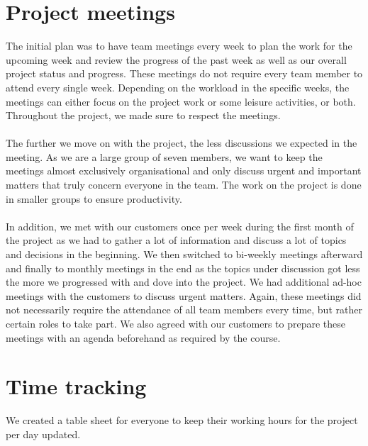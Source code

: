 \section{Project meetings}\label{sec:meetings}

The initial plan was to have team meetings every week to plan the work for the upcoming week and review the progress of the past week as well as our overall project status and progress. These meetings do not require every team member to attend every single week. Depending on the workload in the specific weeks, the meetings can either focus on the project work or some leisure activities, or both. Throughout the project, we made sure to respect the meetings.
\\\\
The further we move on with the project, the less discussions we expected in the meeting. As we are a large group of seven members, we want to keep the meetings almost exclusively organisational and only discuss urgent and important matters that truly concern everyone in the team. The work on the project is done in smaller groups to ensure productivity.
\\\\
In addition, we met with our customers once per week during the first month of the project as we had to gather a lot of information and discuss a lot of topics and decisions in the beginning. We then switched to bi-weekly meetings afterward and finally to monthly meetings in the end as the topics under discussion got less the more we progressed with and dove into the project. We had additional ad-hoc meetings with the customers to discuss urgent matters. Again, these meetings did not necessarily require the attendance of all team members every time, but rather certain roles to take part. We also agreed with our customers to prepare these meetings with an agenda beforehand as required by the course.

\section{Time tracking}\label{sec:time-tracking}

We created a table sheet for everyone to keep their working hours for the project per day updated.
